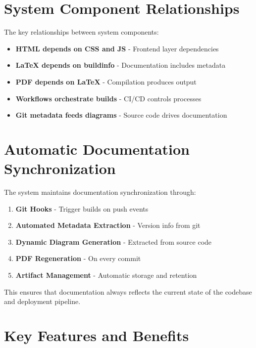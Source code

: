 \section{System Component Relationships}
\label{sec:ComponentRelations}

The key relationships between system components:

\begin{itemize}
    \item \textbf{HTML depends on CSS and JS} - Frontend layer dependencies
    \item \textbf{LaTeX depends on buildinfo} - Documentation includes metadata
    \item \textbf{PDF depends on LaTeX} - Compilation produces output
    \item \textbf{Workflows orchestrate builds} - CI/CD controls processes
    \item \textbf{Git metadata feeds diagrams} - Source code drives documentation
\end{itemize}

\section{Automatic Documentation Synchronization}
\label{sec:AutoSync}

The system maintains documentation synchronization through:

\begin{enumerate}
    \item \textbf{Git Hooks} - Trigger builds on push events
    \item \textbf{Automated Metadata Extraction} - Version info from git
    \item \textbf{Dynamic Diagram Generation} - Extracted from source code
    \item \textbf{PDF Regeneration} - On every commit
    \item \textbf{Artifact Management} - Automatic storage and retention
\end{enumerate}

This ensures that documentation always reflects the current state of the codebase and deployment pipeline.

\section{Key Features and Benefits}
\label{sec:Features}

